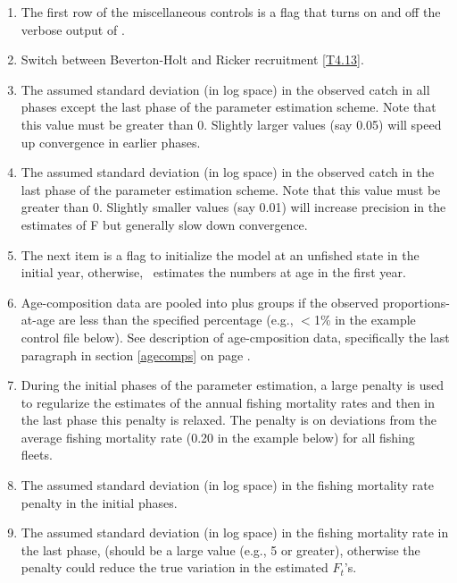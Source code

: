 \begin{multicols}{2}
\begin{enumerate}

	\item The first row of the miscellaneous controls is a flag that turns on and off the verbose output of \iscam.

	\item Switch between Beverton-Holt and Ricker recruitment \eqref{T4.13}.
	
	\item The assumed standard deviation (in log space) in the observed catch in all phases except the last phase of the parameter estimation scheme.  Note that this value must be greater than 0.  Slightly larger values (say 0.05) will speed up convergence in earlier phases.
	
	\item The assumed standard deviation (in log space) in the observed catch in the last phase of the parameter estimation scheme.  Note that this value must be greater than 0.  Slightly smaller values (say 0.01) will increase precision in the estimates of F but generally slow down convergence.
		
	\item The next item is a flag to initialize the model at an unfished state in the initial year, otherwise, \iscam\ estimates the numbers at age in the first year.
	
	\item Age-composition data are pooled into plus groups if the observed proportions-at-age are less than the specified percentage (e.g., $<$1\% in the example control file below).  See description of age-cmposition data, specifically the last paragraph in section \ref{agecomps} on page \pageref{agecomps}.
	
	\item During the initial phases of the parameter estimation, a large penalty is used to regularize the estimates of the annual fishing mortality rates and then in the last phase this penalty is relaxed.  The penalty is on deviations from the average fishing mortality rate (0.20 in the example below) for all fishing fleets.  
	
	\item The assumed standard deviation (in log space) in the fishing mortality rate penalty in the initial phases.
	
	\item The assumed standard deviation (in log space) in the fishing mortality rate in the last phase, (should be a large value (e.g., 5 or greater), otherwise the penalty could reduce the true variation in the estimated $F_t$'s.
	

\end{enumerate}
\end{multicols}
